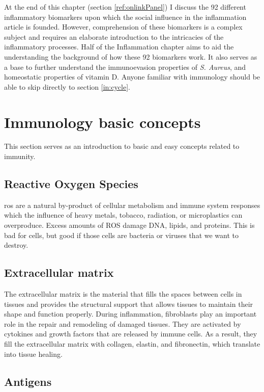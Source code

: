 At the end of this chapter (section \ref{ref:onlinkPanel}) I discuss the 92 different inflammatory biomarkers upon which the social influence in the inflammation article is founded. However, comprehension of these biomarkers is a complex subject and requires an elaborate introduction to the intricacies of the inflammatory processes. Half of the Inflammation chapter aims to aid the understanding the background of how these 92 biomarkers work. It also serves as a base to further understand the immunoevasion properties of \textit{S. Aureus}, and homeostatic properties of vitamin D. Anyone familiar with immunology should be able to skip directly to section \ref{in:cycle}.

\section{Immunology basic concepts}

This section serves as an introduction to basic and easy concepts related to immunity.

\subsection{Reactive Oxygen Species}

\gls{ros} are a natural by-product of cellular metabolism and immune system responses which the influence of heavy metals, tobacco, radiation, or microplastics can overproduce. Excess amounts of ROS damage DNA, lipids, and proteins. This is bad for cells, but good if those cells are bacteria or viruses that we want to destroy.

\subsection{Extracellular matrix}

The extracellular matrix is the material that fills the spaces between cells in tissues and provides the structural support that allows tissues to maintain their shape and function properly. During inflammation, fibroblasts play an important role in the repair and remodeling of damaged tissues. They are activated by cytokines and growth factors that are released by immune cells. As a result, they fill the extracellular matrix with collagen, elastin, and fibronectin, which translate into tissue healing.

\subsection{Antigens}

